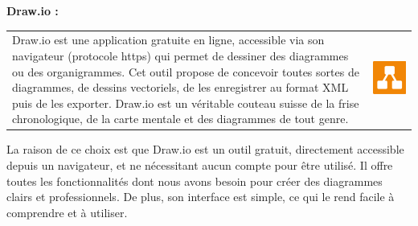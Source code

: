 \documentclass{article}
\begin{document}
\vspace{0,5cm}

\noindent \textbf{Draw.io \cite{drawiointerface}: }

\noindent
\begin{tabular}
{@{}m{}@{\hspace{1em}}m{}@{}}
Draw.io est une application gratuite en ligne, accessible via son navigateur (protocole https) qui permet de dessiner des diagrammes ou des organigrammes.  
Cet outil propose de concevoir toutes sortes de diagrammes, de dessins vectoriels, de les enregistrer au format XML puis de les exporter.  
Draw.io est un véritable couteau suisse de la frise chronologique, de la carte mentale et des diagrammes de tout genre.\cite{draw-io}
&
\includegraphics[width=\linewidth]{drawio (2).png} %
\end{tabular}

\noindent La raison de ce choix est que Draw.io est un outil gratuit, directement accessible depuis un navigateur, et ne nécessitant aucun compte pour être utilisé. Il offre toutes les fonctionnalités dont nous avons besoin pour créer des diagrammes clairs et professionnels. De plus, son interface est simple, ce qui le rend facile à comprendre et à utiliser.
\end{document}
